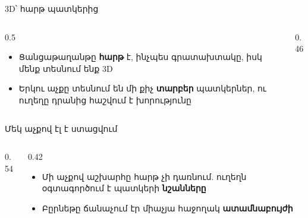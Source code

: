 \begin{frame}{3D՝ հարթ պատկերից}
  \begin{columns}[T]
    \begin{column}{0.5\textwidth}
      \begin{itemize}
        \item Ցանցաթաղանթը \textbf{հարթ} է, ինչպես գրատախտակը, իսկ մենք տեսնում ենք 3D
        \item<2-> Երկու աչքը տեսնում են մի քիչ \textbf{տարբեր} պատկերներ, ու ուղեղը դրանից հաշվում է խորությունը
      \end{itemize}
    \end{column}
    \begin{column}{0.46\textwidth}
      \centering
    \end{column}
  \end{columns}
\end{frame}

\begin{frame}{Մեկ աչքով էլ է ստացվում}
  \begin{columns}[c]
    \begin{column}{0.54\textwidth}
      \centering
      
    \end{column}
    \begin{column}{0.42\textwidth}
      \begin{itemize}
        \item Մի աչքով աշխարհը հարթ չի դառնում. ուղեղն օգտագործում է պատկերի \textbf{նշանները}
        \item<5-> Բըրնեթը ճանաչում էր միաչյա հաջողակ \textbf{ատամնաբույժի}
      \end{itemize}
    \end{column}
  \end{columns}
\end{frame}

